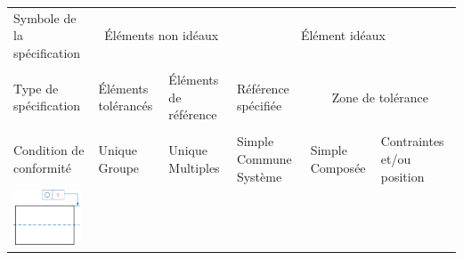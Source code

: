 \documentclass[11pt,oneside]{article}
\begin{document}
\begin{exemple}
\footnotesize{
\begin{center}
\begin{tabular}{|p{}|p{}|p{}|p{}|p{}|p{}|}
\hline
Symbole de la spécification & 
\multicolumn{2}{c|}{Éléments non idéaux} &
\multicolumn{3}{c|}{Élément idéaux} \\
&
\multicolumn{2}{c|}{} &
\multicolumn{3}{c|}{}\\
\hline
Type de spécification & 
Éléments tolérancés &
Éléments de référence & 
Référence spécifiée & 
\multicolumn{2}{c|}{Zone de tolérance} \\
&&&&
\multicolumn{2}{c|}{}\\
\hline
Condition de conformité & 
Unique Groupe & Unique Multiples &
Simple Commune Système &
Simple Composée & 
Contraintes et/ou position \\
\hline
\multirow{12}{*}{\includegraphics[width=2cm]{png/ex_circularite}}&&&&&\\
&&&&&\\
&&&&&\\
&&&&&\\
&&&&&\\
&&&&&\\
&&&&&\\
&&&&&\\
&&&&&\\
&&&&&\\
&&&&&\\
&&&&&\\
\hline
\end{tabular}
\end{center}
}
\end{exemple}
\end{document}
